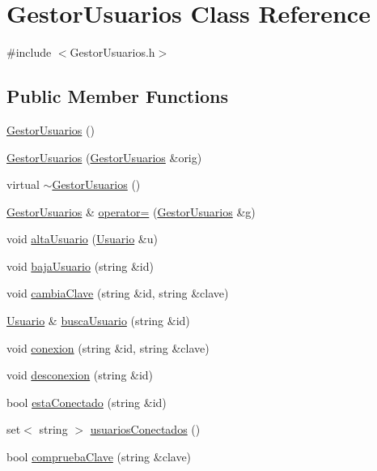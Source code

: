 \hypertarget{class_gestor_usuarios}{}\section{Gestor\+Usuarios Class Reference}
\label{class_gestor_usuarios}


{\ttfamily \#include $<$Gestor\+Usuarios.\+h$>$}

\subsection*{Public Member Functions}
\begin{DoxyCompactItemize}
\item 
\hyperlink{class_gestor_usuarios_a5e10ca400b0d699a70aa9aba8189b389}{Gestor\+Usuarios} ()
\item 
\hyperlink{class_gestor_usuarios_a540f562d1cc4e775874ca59fb58460f2}{Gestor\+Usuarios} (\hyperlink{class_gestor_usuarios}{Gestor\+Usuarios} \&orig)
\item 
virtual \hyperlink{class_gestor_usuarios_a5d3e11b3129b1d988fe045cf38518ccb}{$\sim$\+Gestor\+Usuarios} ()
\item 
\hyperlink{class_gestor_usuarios}{Gestor\+Usuarios} \& \hyperlink{class_gestor_usuarios_abd8499f2178dc4e730674a78ecddae79}{operator=} (\hyperlink{class_gestor_usuarios}{Gestor\+Usuarios} \&g)
\item 
void \hyperlink{class_gestor_usuarios_a0c04ca0167fd1f00d8df198441763311}{alta\+Usuario} (\hyperlink{class_usuario}{Usuario} \&u)
\item 
void \hyperlink{class_gestor_usuarios_a68d73f9a0ede622220012502ffc23dcf}{baja\+Usuario} (string \&id)
\item 
void \hyperlink{class_gestor_usuarios_ad14240167762426efe2c8f2af2421fe0}{cambia\+Clave} (string \&id, string \&clave)
\item 
\hyperlink{class_usuario}{Usuario} \& \hyperlink{class_gestor_usuarios_a7f941f9780501cd260591a96ba30d048}{busca\+Usuario} (string \&id)
\item 
void \hyperlink{class_gestor_usuarios_a3b929870c33c4864d3c1f32f2614a64d}{conexion} (string \&id, string \&clave)
\item 
void \hyperlink{class_gestor_usuarios_a1e57859037abf37a190ad2c60ed22f2b}{desconexion} (string \&id)
\item 
bool \hyperlink{class_gestor_usuarios_a41196c2a9b3abd71e7eb8f79fd765960}{esta\+Conectado} (string \&id)
\item 
set$<$ string $>$ \hyperlink{class_gestor_usuarios_a2a20b4c548e4bbe113174a416873194a}{usuarios\+Conectados} ()
\item 
bool \hyperlink{class_gestor_usuarios_a14c8dfce3dabbbdc4cd6214e6093ed60}{comprueba\+Clave} (string \&clave)
\end{DoxyCompactItemize}


